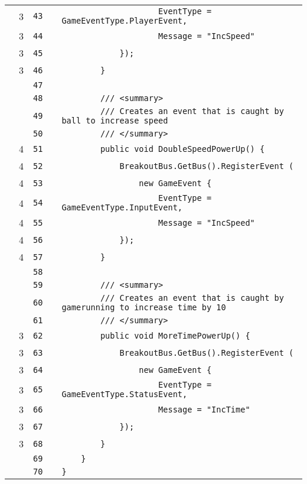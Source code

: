 \documentclass[a4paper,landscape,10pt]{article}
\begin{document}
\begin{longtable}[l]{lrrll}
\cellcolor{green} & 3 & \verb~43~ & & \verb~                    EventType = GameEventType.PlayerEvent,~\\
\cellcolor{green} & 3 & \verb~44~ & & \verb~                    Message = "IncSpeed"~\\
\cellcolor{green} & 3 & \verb~45~ & & \verb~            });~\\
\cellcolor{green} & 3 & \verb~46~ & & \verb~        }~\\
\cellcolor{gray} &  & \verb~47~ & & \verb~~\\
\cellcolor{gray} &  & \verb~48~ & & \verb~        /// <summary>~\\
\cellcolor{gray} &  & \verb~49~ & & \verb~        /// Creates an event that is caught by ball to increase speed~\\
\cellcolor{gray} &  & \verb~50~ & & \verb~        /// </summary>~\\
\cellcolor{green} & 4 & \verb~51~ & & \verb~        public void DoubleSpeedPowerUp() {~\\
\cellcolor{green} & 4 & \verb~52~ & & \verb~            BreakoutBus.GetBus().RegisterEvent (~\\
\cellcolor{green} & 4 & \verb~53~ & & \verb~                new GameEvent {~\\
\cellcolor{green} & 4 & \verb~54~ & & \verb~                    EventType = GameEventType.InputEvent,~\\
\cellcolor{green} & 4 & \verb~55~ & & \verb~                    Message = "IncSpeed"~\\
\cellcolor{green} & 4 & \verb~56~ & & \verb~            });~\\
\cellcolor{green} & 4 & \verb~57~ & & \verb~        }~\\
\cellcolor{gray} &  & \verb~58~ & & \verb~~\\
\cellcolor{gray} &  & \verb~59~ & & \verb~        /// <summary>~\\
\cellcolor{gray} &  & \verb~60~ & & \verb~        /// Creates an event that is caught by gamerunning to increase time by 10~\\
\cellcolor{gray} &  & \verb~61~ & & \verb~        /// </summary>~\\
\cellcolor{green} & 3 & \verb~62~ & & \verb~        public void MoreTimePowerUp() {~\\
\cellcolor{green} & 3 & \verb~63~ & & \verb~            BreakoutBus.GetBus().RegisterEvent (~\\
\cellcolor{green} & 3 & \verb~64~ & & \verb~                new GameEvent {~\\
\cellcolor{green} & 3 & \verb~65~ & & \verb~                    EventType = GameEventType.StatusEvent,~\\
\cellcolor{green} & 3 & \verb~66~ & & \verb~                    Message = "IncTime"~\\
\cellcolor{green} & 3 & \verb~67~ & & \verb~            });~\\
\cellcolor{green} & 3 & \verb~68~ & & \verb~        }~\\
\cellcolor{gray} &  & \verb~69~ & & \verb~    }~\\
\cellcolor{gray} &  & \verb~70~ & & \verb~}~\\
\end{longtable}
\newpage
\end{document}
